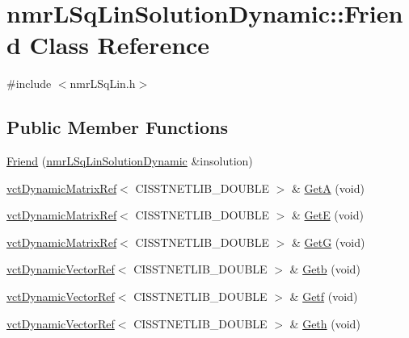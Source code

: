\hypertarget{classnmr_l_sq_lin_solution_dynamic_1_1_friend}{}\section{nmr\+L\+Sq\+Lin\+Solution\+Dynamic\+:\+:Friend Class Reference}
\label{classnmr_l_sq_lin_solution_dynamic_1_1_friend}


{\ttfamily \#include $<$nmr\+L\+Sq\+Lin.\+h$>$}

\subsection*{Public Member Functions}
\begin{DoxyCompactItemize}
\item 
\hyperlink{classnmr_l_sq_lin_solution_dynamic_1_1_friend_abf75c7fb3d89303f167226e90de9724a}{Friend} (\hyperlink{classnmr_l_sq_lin_solution_dynamic}{nmr\+L\+Sq\+Lin\+Solution\+Dynamic} \&insolution)
\item 
\hyperlink{classvct_dynamic_matrix_ref}{vct\+Dynamic\+Matrix\+Ref}$<$ C\+I\+S\+S\+T\+N\+E\+T\+L\+I\+B\+\_\+\+D\+O\+U\+B\+L\+E $>$ \& \hyperlink{classnmr_l_sq_lin_solution_dynamic_1_1_friend_a133ba2330bd2db5fa3cd3dab3e7e41f5}{Get\+A} (void)
\item 
\hyperlink{classvct_dynamic_matrix_ref}{vct\+Dynamic\+Matrix\+Ref}$<$ C\+I\+S\+S\+T\+N\+E\+T\+L\+I\+B\+\_\+\+D\+O\+U\+B\+L\+E $>$ \& \hyperlink{classnmr_l_sq_lin_solution_dynamic_1_1_friend_ab78018b4416251b404af53dd49ccf1da}{Get\+E} (void)
\item 
\hyperlink{classvct_dynamic_matrix_ref}{vct\+Dynamic\+Matrix\+Ref}$<$ C\+I\+S\+S\+T\+N\+E\+T\+L\+I\+B\+\_\+\+D\+O\+U\+B\+L\+E $>$ \& \hyperlink{classnmr_l_sq_lin_solution_dynamic_1_1_friend_af0b6de5f797353422a5a0a64a5fc889b}{Get\+G} (void)
\item 
\hyperlink{classvct_dynamic_vector_ref}{vct\+Dynamic\+Vector\+Ref}$<$ C\+I\+S\+S\+T\+N\+E\+T\+L\+I\+B\+\_\+\+D\+O\+U\+B\+L\+E $>$ \& \hyperlink{classnmr_l_sq_lin_solution_dynamic_1_1_friend_a91038670070e0134c2cd0892edfe0166}{Getb} (void)
\item 
\hyperlink{classvct_dynamic_vector_ref}{vct\+Dynamic\+Vector\+Ref}$<$ C\+I\+S\+S\+T\+N\+E\+T\+L\+I\+B\+\_\+\+D\+O\+U\+B\+L\+E $>$ \& \hyperlink{classnmr_l_sq_lin_solution_dynamic_1_1_friend_a0f0235acd7c3fb49a43a03f60b741cb6}{Getf} (void)
\item 
\hyperlink{classvct_dynamic_vector_ref}{vct\+Dynamic\+Vector\+Ref}$<$ C\+I\+S\+S\+T\+N\+E\+T\+L\+I\+B\+\_\+\+D\+O\+U\+B\+L\+E $>$ \& \hyperlink{classnmr_l_sq_lin_solution_dynamic_1_1_friend_a0e66f7bc106e85d3f1de91bedf65cf71}{Geth} (void)

\end{DoxyCompactItemize}
